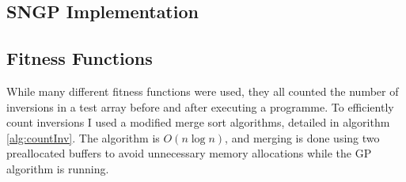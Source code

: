 \documentclass{article}
\begin{document}
		\subsection{SNGP Implementation}
		
		\subsection{Fitness Functions}
		
			While many different fitness functions were used, they all counted the number of inversions in a test array before and after executing a programme. To efficiently count inversions I used a modified merge sort algorithms, detailed in algorithm \ref{alg:countInv}. The algorithm is $O(n\log{}n)$, and merging is done using two preallocated buffers to avoid unnecessary memory allocations while the GP algorithm is running.
			
\end{document}
